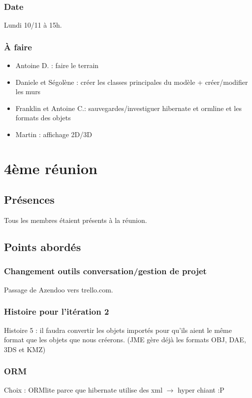 \documentclass[12pt,a4paper]{article}
\begin{document}
		\subsubsection{Date}
			Lundi 10/11 à 15h.
			
		\subsubsection{À faire}
			\begin{itemize}
				\item Antoine D. : faire le terrain
				\item Daniele et Ségolène : créer les classes principales du modèle + créer/modifier les murs
				\item Franklin et Antoine C.: sauvegardes/investiguer hibernate et ormline et les formats des objets
				\item Martin : affichage 2D/3D 
			\end{itemize}

\newpage
\section{4ème réunion}
	\subsection{Présences}
		Tous les membres étaient présents à la réunion.
	\subsection{Points abordés}
	
		\subsubsection{Changement outils conversation/gestion de projet}
			Passage de Azendoo vers trello.com.
		\subsubsection{Histoire pour l'itération 2}
			Histoire 5 : il faudra convertir les objets importés pour qu'ils aient le même format que les objets que nous créerons. (JME gère déjà les formats OBJ, DAE, 3DS et KMZ)
			
		\subsubsection{ORM}
			Choix : ORMlite parce que hibernate utilise des xml $\rightarrow$ hyper chiant :P
			
\end{document}
